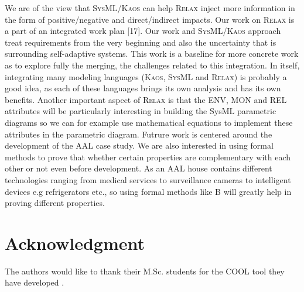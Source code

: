 \documentclass[10pt, conference, compsocconf]{IEEEtran}
\def\myrelax{\textsc{Relax}}                  %
\def\sysml{\textsc{SysML}}
\def\kaos{\textsc{Kaos}}
\begin{document}
We are of the view that \sysml{}/\kaos{} can help \myrelax{} inject more information in the form of positive/negative and direct/indirect impacts. Our work on \myrelax{} is a part of an integrated work plan [17].  Our work and \sysml{}/\kaos{} approach treat requirements from the very beginning and also the uncertainty that is surrounding self-adaptive systems. This work is a baseline for more concrete work as to explore fully the merging, the challenges related to this integration. In itself, integrating many modeling languages (\kaos, \sysml{} and \myrelax{}) is probably a good idea, as each of these languages brings its own analysis and has its own benefits. Another important aspect of \myrelax{} is that the ENV, MON and REL attributes will be particularly interesting in building the SysML parametric diagrams so we can for example use mathematical equations to implement these attributes in the parametric diagram. Futrure work is centered around the development of the AAL case study. We are also interested in using formal methods to prove that whether certain properties are complementary with each other or not even before development. As an AAL house contains different technologies ranging from medical services to surveillance cameras to intelligent devices e.g refrigerators etc., so using formal methods like B will greatly help in proving different properties. 


\section*{Acknowledgment}

The authors would like to thank their M.Sc. students for the COOL tool they have developed \cite{test10}.
\end{document}
